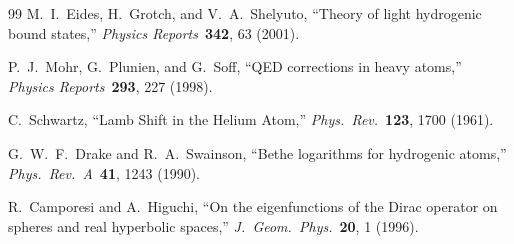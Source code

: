 \documentclass[11pt]{article}
\begin{document}
\begin{thebibliography}{99}
M.~I.~Eides, H.~Grotch, and V.~A.~Shelyuto, ``Theory of light
hydrogenic bound states,''
\textit{Physics Reports}\ \textbf{342}, 63 (2001).

P.~J.~Mohr, G.~Plunien, and G.~Soff, ``QED corrections in heavy
atoms,'' \textit{Physics Reports}\ \textbf{293}, 227 (1998).

C.~Schwartz, ``Lamb Shift in the Helium Atom,''
\textit{Phys.\ Rev.}\ \textbf{123}, 1700 (1961).

G.~W.~F.~Drake and R.~A.~Swainson, ``Bethe logarithms for hydrogenic
atoms,'' \textit{Phys.\ Rev.\ A}\ \textbf{41}, 1243 (1990).

R.~Camporesi and A.~Higuchi, ``On the eigenfunctions of the Dirac
operator on spheres and real hyperbolic spaces,''
\textit{J.\ Geom.\ Phys.}\ \textbf{20}, 1 (1996).

\end{thebibliography}
\end{document}

